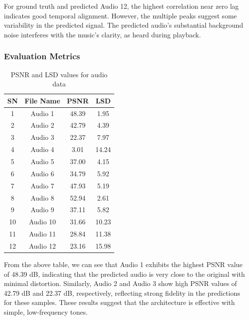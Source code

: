 \documentclass{ioereport}
\begin{document}
    For ground truth and predicted Audio 12, the highest correlation near zero lag indicates good temporal alignment. However, the multiple peaks suggest some variability in the predicted signal. The predicted audio's substantial background noise interferes with the music's clarity, as heard during playback.

    \subsubsection{Evaluation Metrics}
    \begin{table}[H]
    \caption{PSNR and LSD values for audio data}
    \centering
    \begin{tabular}{|c|c|c|c|}
        \hline
        \textbf{SN} & \textbf{File Name} & \textbf{PSNR} & \textbf{LSD} \\
        \hline
        1  & Audio 1 & 48.39 & 1.95  \\
        \hline
        2  & Audio 2 & 42.79 & 4.39  \\
        \hline
        3  & Audio 3 & 22.37 & 7.97  \\
        \hline
        4  & Audio 4 & 3.01  & 14.24 \\
        \hline
        5  & Audio 5 & 37.00 & 4.15  \\
        \hline
        6  & Audio 6 & 34.79 & 5.92  \\
        \hline
        7  & Audio 7 & 47.93 & 5.19  \\
        \hline
        8  & Audio 8 & 52.94 & 2.61  \\
        \hline
        9  & Audio 9 & 37.11 & 5.82  \\
        \hline
        10 & Audio 10 & 31.66 & 10.23 \\
        \hline
        11 & Audio 11 & 28.84 & 11.38 \\
        \hline
        12 & Audio 12 & 23.16 & 15.98 \\
        \hline
    \end{tabular}
    \label{tab:audio_metrics_ordered}
\end{table}

From the above table, we can see that Audio 1 exhibits the highest PSNR value of 48.39 dB, indicating that the predicted audio is very close to the original with minimal distortion. Similarly, Audio 2 and Audio 3 show high PSNR values of 42.79 dB and 22.37 dB, respectively, reflecting strong fidelity in the predictions for these samples. These results suggest that the architecture is effective with simple, low-frequency tones.
\end{document}
